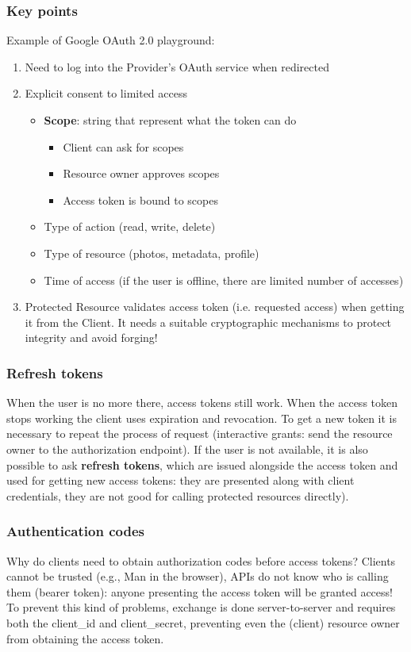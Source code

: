 \documentclass[a4paper, 10pt, titlepage]{article}
\begin{document}
\subsubsection{Key points}
Example of Google OAuth 2.0 playground:
\begin{enumerate}
\item Need to log into the Provider’s OAuth service when redirected
\item Explicit consent to limited access
	\begin{itemize}
	\item \textbf{Scope}: string that represent what the token can do
		\begin{itemize}
		\item Client can ask for scopes
		\item Resource owner approves scopes
		\item Access token is bound to scopes
		\end{itemize}
	\item Type of action (read, write, delete)
	\item Type of resource (photos, metadata, profile)
	\item Time of access (if the user is offline, there are limited number of accesses)	
	\end{itemize}
\item Protected Resource validates access token (i.e. requested
access) when getting it from the Client. It needs a suitable cryptographic mechanisms to protect integrity and avoid forging!
\end{enumerate}

\subsubsection*{Refresh tokens}
When the user is no more there, access tokens still work. When the access token stops working the client uses expiration and revocation. To get a new token it is necessary to repeat the process of request (interactive grants: send the resource owner to the authorization endpoint). If the user is not available, it is also possible to ask \textbf{refresh tokens}, which are issued alongside the access token and used for getting new access tokens: they are presented along with client credentials, they are not good for calling protected resources directly).

\subsubsection*{Authentication codes}
Why do clients need to obtain authorization codes before access tokens? Clients cannot be trusted (e.g., Man in the browser), APIs do not know who is calling them (bearer token): anyone presenting the access token will be granted access! To prevent this kind of problems, exchange is done server-to-server and requires both the client\_id and client\_secret, preventing even the (client) resource owner from obtaining the access token.
\end{document}

